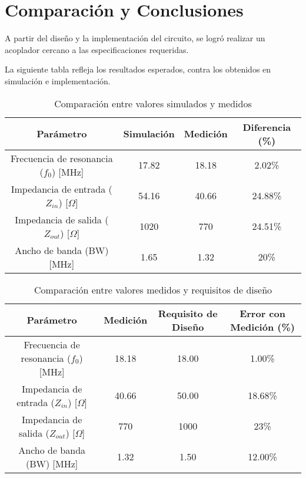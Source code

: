 \section{Comparación y Conclusiones}
A partir del diseño y la implementación del circuito, se logró realizar un acoplador cercano a las especificaciones requeridas.

La siguiente tabla refleja los resultados esperados, contra los obtenidos en simulación e implementación.

\begin{table}[h]
    \centering
    \begin{tabular}{|c|c|c|c|}
        \hline
        \textbf{Parámetro} & \textbf{Simulación} & \textbf{Medición} & \textbf{Diferencia (\%)} \\
        \hline
        Frecuencia de resonancia ($f_0$) [MHz] & 17.82 & 18.18 & 2.02\% \\
        \hline
        Impedancia de entrada ($Z_{in}$) [$\Omega$] & 54.16 & 40.66 & 24.88\% \\
        \hline
        Impedancia de salida ($Z_{out}$) [$\Omega$] & 1020 & 770 & 24.51\% \\
        \hline
        Ancho de banda (BW) [MHz] & 1.65 & 1.32 & 20\% \\
        \hline
    \end{tabular}
    \caption{Comparación entre valores simulados y medidos}
    \label{tab:sim_vs_med}
\end{table}

\begin{table}[h]
    \centering
    \begin{tabular}{|c|c|c|c|}
        \hline
        \textbf{Parámetro} & \textbf{Medición} & \textbf{Requisito de Diseño} & \textbf{Error con Medición (\%)} \\
        \hline
        Frecuencia de resonancia ($f_0$) [MHz] & 18.18 & 18.00 & 1.00\% \\
        \hline
        Impedancia de entrada ($Z_{in}$) [$\Omega$] & 40.66 & 50.00 & 18.68\% \\
        \hline
        Impedancia de salida ($Z_{out}$) [$\Omega$] & 770 & 1000 & 23\% \\
        \hline
        Ancho de banda (BW) [MHz] & 1.32 & 1.50 & 12.00\% \\
        \hline
    \end{tabular}
    \caption{Comparación entre valores medidos y requisitos de diseño}
    \label{tab:med_vs_req}
\end{table}


